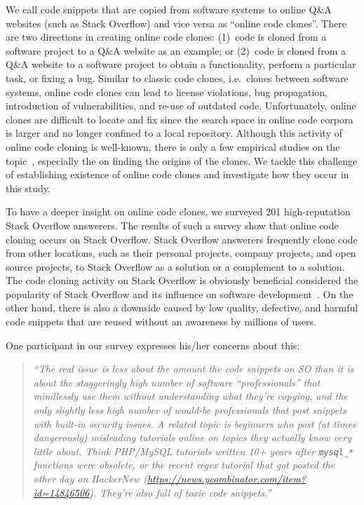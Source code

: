 \documentclass[10pt,journal,compsoc]{IEEEtran}
\begin{document}
We call code snippets that are copied from software systems to online Q\&A
websites (such as Stack Overflow) and vice versa as ``online code clones''.
There are two directions in creating online code clones: (1)~code is cloned from
a software project to a Q\&A website as an example; or (2)~code is cloned from a
Q\&A website to a software project to obtain a functionality, perform a
particular task, or fixing a bug. %
Similar to classic code clones, i.e.~clones between software systems, online
code clones can lead to license violations, bug propagation, introduction of
vulnerabilities, and re-use of outdated code. Unfortunately, online clones are
difficult to locate and fix since the search space in online code corpora is
larger and no longer confined to a local repository.
Although this activity of online code cloning is well-known, there is only a few
empirical studies on the topic~\cite{An2017,Abdalkareem2017,Baltes2017}, especially
the on finding the origins of the clones.
We tackle this challenge of establishing existence of online code clones and
investigate how they occur in this study.

To have a deeper insight on online code clones, we surveyed 201 high-reputation
Stack Overflow answerers. The results of such a survey show that online code
cloning occurs on Stack Overflow. Stack Overflow answerers frequently clone code
from other locations, such as their personal projects, company projects, and
open source projects, to Stack Overflow as a solution or a complement to a
solution. The code cloning activity on Stack Overflow is obviously beneficial
considered the popularity of Stack Overflow and its influence on software
development~\cite{Ponzanelli2013,Ponzanelli2014,Park2014}. On the other hand,
there is also a downside caused by low quality, defective, and harmful code
snippets that are reused without an awareness by millions of users.

One participant in our survey expresses his/her concerns about this:

\begin{quote}
	\textit{``The real issue is less about the amount the code snippets
	on SO than it is about the staggeringly high number of software
	``professionals'' that mindlessly use them without understanding what they're
	copying, and the only slightly less high number of would-be professionals that
	post snippets with built-in security issues.  A related topic is beginners who
	post (at times dangerously) misleading tutorials online on topics they actually
	know very little about. Think PHP/MySQL tutorials written 10+ years after
	\texttt{mysql\_*} functions were obsolete, or the recent regex tutorial that
	got posted the other day on HackerNew
	(\url{https://news.ycombinator.com/item?id=14846506}). They're also full of
	toxic code snippets.''}
\end{quote}
\end{document}
